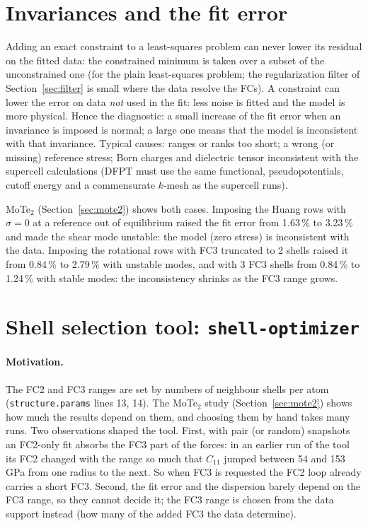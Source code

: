 \documentclass[11pt,a4paper]{article}
\newcommand{\code}[1]{\texttt{#1}}
\begin{document}
\section{Invariances and the fit error}\label{sec:invfit}
Adding an exact constraint to a least-squares problem can never lower its residual on the fitted data: the
constrained minimum is taken over a subset of the unconstrained one (for the plain least-squares problem; the
regularization filter of Section~\ref{sec:filter} is small where the data resolve the FCs). A constraint can lower the
error on data \emph{not} used in the fit: less noise is fitted and the model is more physical. Hence the diagnostic:
a small increase of the fit error when an invariance is imposed is normal; a large one means that the model is
inconsistent with that invariance. Typical causes: ranges or ranks too short; a wrong (or missing) reference stress;
Born charges and dielectric tensor inconsistent with the supercell calculations (DFPT must use the same functional,
pseudopotentials, cutoff energy and a commensurate $k$-mesh as the supercell runs).

MoTe$_2$ (Section~\ref{sec:mote2}) shows both cases. Imposing the Huang rows with $\sigma=0$ at a reference out of
equilibrium raised the fit error from 1.63\,\% to 3.23\,\% and made the shear mode unstable: the model (zero stress) is
inconsistent with the data. Imposing the rotational rows with FC3 truncated to 2 shells raised it from 0.84\,\% to
2.79\,\% with unstable modes, and with 3 FC3 shells from 0.84\,\% to 1.24\,\% with stable modes: the inconsistency shrinks as
the FC3 range grows.

\section{Shell selection tool: \code{shell-optimizer}}\label{sec:shellopt}
\paragraph{Motivation.} The FC2 and FC3 ranges are set by numbers of neighbour shells per atom
(\code{structure.params} lines 13, 14). The MoTe$_2$ study (Section~\ref{sec:mote2}) shows how much the results depend
on them, and choosing them by hand takes many runs. Two observations shaped the tool. First, with pair (or random)
snapshots an FC2-only fit absorbs the FC3 part of the forces: in an earlier run of the tool its FC2 changed with
the range so much that $C_{11}$ jumped between 54 and 153\,GPa from one radius to the next. So when FC3 is requested
the FC2 loop already carries a short FC3. Second, the fit error and the dispersion barely depend on the FC3 range,
so they cannot decide it; the FC3 range is chosen from the data support instead (how many of the added FC3 the
data determine).
\end{document}
